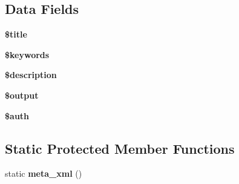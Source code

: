 \subsection*{Data Fields}
\begin{DoxyCompactItemize}
\item 
\hypertarget{class_controller_ada57e7bb7c152edad18fe2f166188691}{
{\bfseries \$title}}
\label{class_controller_ada57e7bb7c152edad18fe2f166188691}

\item 
\hypertarget{class_controller_a9fbd95bfcdf27d802a8c7938529a61ba}{
{\bfseries \$keywords}}
\label{class_controller_a9fbd95bfcdf27d802a8c7938529a61ba}

\item 
\hypertarget{class_controller_a87b032cba06009e3467abf1c8018d960}{
{\bfseries \$description}}
\label{class_controller_a87b032cba06009e3467abf1c8018d960}

\item 
\hypertarget{class_controller_a73004ce9cd673c1bfafd1dc351134797}{
{\bfseries \$output}}
\label{class_controller_a73004ce9cd673c1bfafd1dc351134797}

\item 
\hypertarget{class_controller_a20d7415a9c3391b32d7fe2136fce6e2c}{
{\bfseries \$auth}}
\label{class_controller_a20d7415a9c3391b32d7fe2136fce6e2c}

\end{DoxyCompactItemize}
\subsection*{Static Protected Member Functions}
\begin{DoxyCompactItemize}
\item 
\hypertarget{class_api_controller_a1c8270b047df3823fe3e5234ca30d634}{
static {\bfseries meta\_\-xml} ()}
\label{class_api_controller_a1c8270b047df3823fe3e5234ca30d634}

\end{DoxyCompactItemize}
